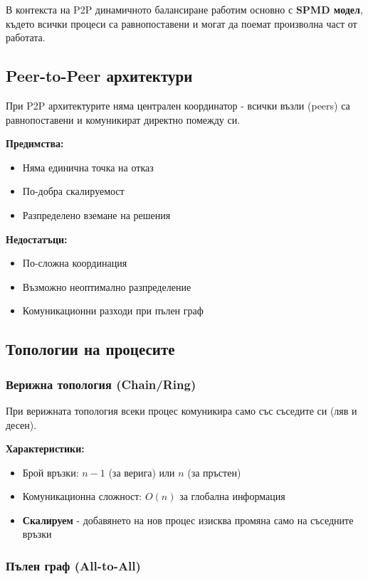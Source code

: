 \documentclass[12pt,a4paper]{article}
\begin{document}
В контекста на P2P динамичното балансиране работим основно с \textbf{SPMD модел}, където всички процеси са равнопоставени и могат да поемат произволна част от работата.

\subsection{Peer-to-Peer архитектури}

При P2P архитектурите няма централен координатор - всички възли (peers) са равнопоставени и комуникират директно помежду си.

\textbf{Предимства:}
\begin{itemize}
    \item Няма единична точка на отказ
    \item По-добра скалируемост
    \item Разпределено вземане на решения
\end{itemize}

\textbf{Недостатъци:}
\begin{itemize}
    \item По-сложна координация
    \item Възможно неоптимално разпределение
    \item Комуникационни разходи при пълен граф
\end{itemize}

\subsection{Топологии на процесите}

\subsubsection{Верижна топология (Chain/Ring)}

При верижната топология всеки процес комуникира само със съседите си (ляв и десен).

\textbf{Характеристики:}
\begin{itemize}
    \item Брой връзки: $n-1$ (за верига) или $n$ (за пръстен)
    \item Комуникационна сложност: $O(n)$ за глобална информация
    \item \textbf{Скалируем} - добавянето на нов процес изисква промяна само на съседните връзки
\end{itemize}

\subsubsection{Пълен граф (All-to-All)}
\end{document}
